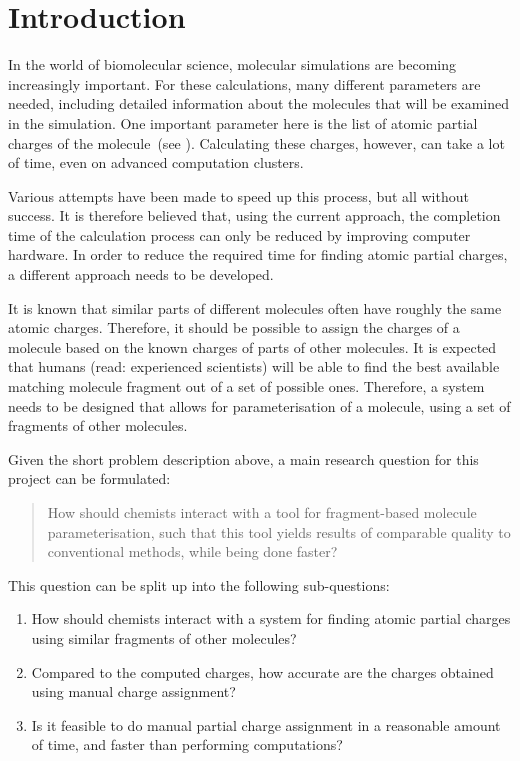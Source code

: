 \chapter{Introduction}

In the world of biomolecular science, molecular simulations are becoming increasingly important. For these calculations, many different parameters are needed, including detailed information about the molecules that will be examined in the simulation. One important parameter here is the list of atomic partial charges of the molecule~(see ). Calculating these charges, however, can take a lot of time, even on advanced computation clusters.

Various attempts have been made to speed up this process, but all without success. It is therefore believed that, using the current approach, the completion time of the calculation process can only be reduced by improving computer hardware. In order to reduce the required time for finding atomic partial charges, a different approach needs to be developed.

It is known that similar parts of different molecules often have roughly the same atomic charges. Therefore, it should be possible to assign the charges of a molecule based on the known charges of parts of other molecules. It is expected that humans (read: experienced scientists) will be able to find the best available matching molecule fragment out of a set of possible ones. Therefore, a system needs to be designed that allows for parameterisation of a molecule, using a set of fragments of other molecules.

Given the short problem description above, a main research question for this project can be formulated:
\begin{quote}
How should chemists interact with a tool for fragment-based molecule parameterisation, such that this tool yields results of comparable quality to conventional methods, while being done faster?
\end{quote}

This question can be split up into the following sub-questions:
\begin{enumerate}
\item How should chemists interact with a system for finding atomic partial charges using similar fragments of other molecules?
\item Compared to the computed charges, how accurate are the charges obtained using manual charge assignment?
\item Is it feasible to do manual partial charge assignment in a reasonable amount of time, and faster than performing computations?
\end{enumerate}

